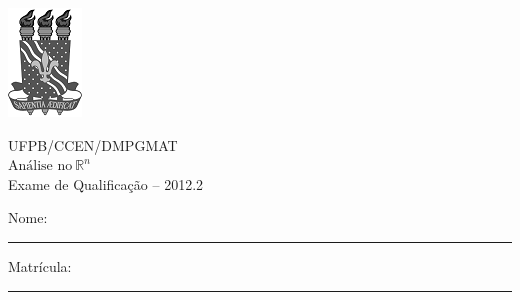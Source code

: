 \documentclass[11pt]{report}
\begin{document}
	\thispagestyle{empty}

	\noindent
	\begin{minipage}[c]{0.2\linewidth}
		\includegraphics{sm-ufpb-logo.png}
	\end{minipage} %
	\begin{minipage}[c]{0.7\linewidth}
		\begin{center}
			UFPB/CCEN/DMPGMAT \\
			$\mbox{Análise no} \ \mathbb{R}^{n}$ \\
			Exame de Qualificação -- 2012.2
		\end{center}
	\end{minipage}

	\vspace{0.8cm}
	
	Nome:\rule{10cm}{0.1mm}
	Matrícula:\rule{3cm}{0.1mm}
	\vspace{1cm}
	
	
\end{document}
